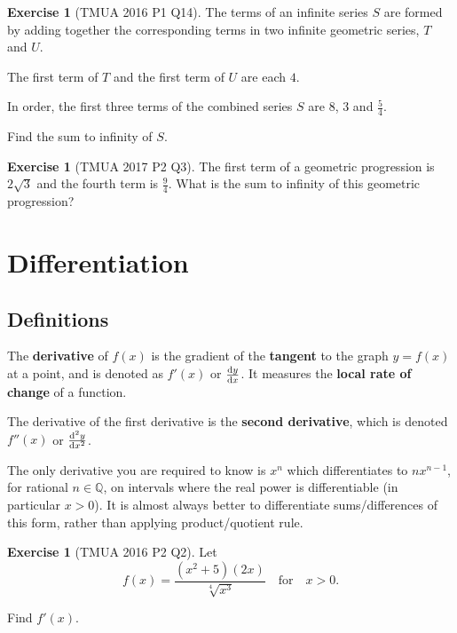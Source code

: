 \documentclass[11pt]{article}
\theoremstyle{definition}
\newtheorem{example}[theorem]{Exercise}
\theoremstyle{remark}
\newcommand{\pqty}[1]{\left(#1\right)}
\newcommand{\flatfrac}[2]{\frac{#1}{#2}}
\newcommand{\QQ}{\mathbb{Q}}
\newcommand{\qfor}{\quad\text{for}\quad}
\begin{document}
\begin{example}[TMUA 2016 P1 Q14]\label{tmua-4-unit-014}
    The terms of an infinite series \(S\) are formed by adding together the corresponding terms in two infinite geometric series, \(T\) and \(U\).

    The first term of \(T\) and the first term of \(U\) are each \(4\).

    In order, the first three terms of the combined series \(S\) are \(8\), \(3\) and \(\flatfrac{5}{4}\).

    Find the sum to infinity of \(S\).
\end{example}

\begin{example}[TMUA 2017 P2 Q3]\label{tmua-4-unit-015}
    The first term of a geometric progression is \(2 \sqrt{3}\) and the fourth term is \(\flatfrac{9}{4}\). What is the sum to infinity of this geometric progression?
\end{example}

\section{Differentiation}\label{tmua-4-section-002}
\subsection{Definitions}\label{tmua-4-subsection-004}

The \textbf{derivative} of \(f\pqty{x}\) is the gradient of the \textbf{tangent} to the graph \(y = f\pqty{x}\) at a point, and is denoted as \(f'\pqty{x}\) or \(\dv*{y}{x}\). It measures the \textbf{local rate of change} of a function.

The derivative of the first derivative is the \textbf{second derivative}, which is denoted \(f''\pqty{x}\) or \(\dv*[2]{y}{x}\).

The only derivative you are required to know is \(x^n\) which differentiates to \(n x^{n - 1}\), for rational \(n\in\QQ\), on intervals where the real power is differentiable (in particular \(x>0\)). It is almost always better to differentiate sums/differences of this form, rather than applying product/quotient rule.

\begin{example}[TMUA 2016 P2 Q2]\label{tmua-4-unit-016}
    Let
    \[
        f\pqty{x} = \frac{\pqty{x^2 + 5} \pqty{2x}}{\sqrt[4]{x^3}} \qfor x > 0.
    \]  

    Find \(f'\pqty{x}\).
\end{example}
\end{document}
